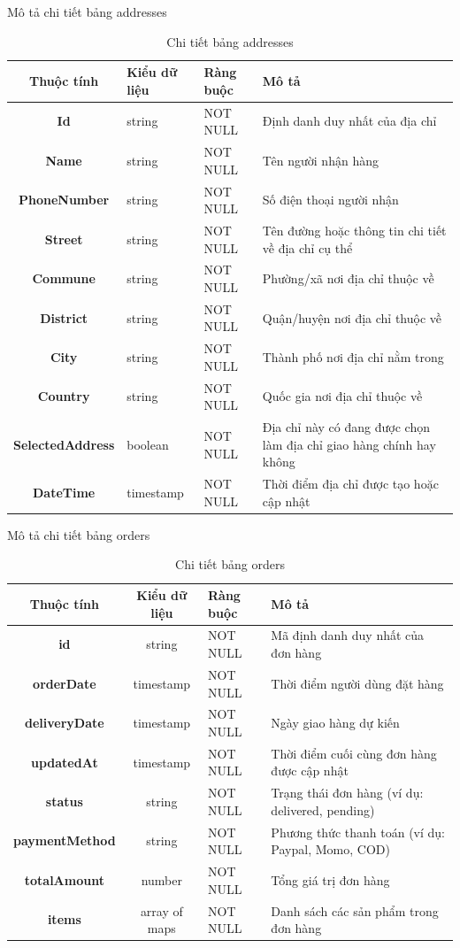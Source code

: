 \documentclass[../DoAn.tex]{subfiles}
\begin{document}
Mô tả chi tiết bảng addresses

\begin{table}[H]
\centering
\begin{tabular}{|c|p{3.5cm}|l|p{7cm}|}
\hline
\textbf{Thuộc tính} & \textbf{Kiểu dữ liệu} & \textbf{Ràng buộc} & \textbf{Mô tả} \\ \hline
\textbf{Id} & string & NOT NULL & Định danh duy nhất của địa chỉ \\ \hline
\textbf{Name} & string & NOT NULL & Tên người nhận hàng \\ \hline
\textbf{PhoneNumber} & string & NOT NULL & Số điện thoại người nhận\\ \hline
\textbf{Street} & string & NOT NULL & Tên đường hoặc thông tin chi tiết về địa chỉ cụ thể \\ \hline
\textbf{Commune} & string & NOT NULL & Phường/xã nơi địa chỉ thuộc về \\ \hline
\textbf{District} & string & NOT NULL & Quận/huyện nơi địa chỉ thuộc về \\ \hline
\textbf{City} & string & NOT NULL & Thành phố nơi địa chỉ nằm trong \\ \hline
\textbf{Country} & string & NOT NULL & Quốc gia nơi địa chỉ thuộc về \\ \hline
\textbf{SelectedAddress} & boolean & NOT NULL & Địa chỉ này có đang được chọn làm địa chỉ giao hàng chính hay không \\ \hline
\textbf{DateTime} & timestamp & NOT NULL & Thời điểm địa chỉ được tạo hoặc cập nhật \\ \hline
\end{tabular}
\caption{Chi tiết bảng addresses}
\label{tab:addressesTable}
\end{table}

Mô tả chi tiết bảng orders
\begin{table}[H]
\centering
\begin{tabular}{|c|c|l|p{7cm}|}
\hline
\textbf{Thuộc tính} & \textbf{Kiểu dữ liệu} & \textbf{Ràng buộc} & \textbf{Mô tả} \\ \hline
\textbf{id} & string & NOT NULL & Mã định danh duy nhất của đơn hàng \\ \hline
\textbf{orderDate} & timestamp & NOT NULL & Thời điểm người dùng đặt hàng \\ \hline
\textbf{deliveryDate} & timestamp & NOT NULL & Ngày giao hàng dự kiến \\ \hline
\textbf{updatedAt} & timestamp & NOT NULL & Thời điểm cuối cùng đơn hàng được cập nhật \\ \hline
\textbf{status} & string & NOT NULL & Trạng thái đơn hàng (ví dụ: delivered, pending) \\ \hline
\textbf{paymentMethod} & string & NOT NULL & Phương thức thanh toán (ví dụ: Paypal, Momo, COD) \\ \hline
\textbf{totalAmount} & number & NOT NULL & Tổng giá trị đơn hàng \\ \hline
\textbf{items} & array of maps & NOT NULL & Danh sách các sản phẩm trong đơn hàng \\ \hline
\end{tabular}
\caption{Chi tiết bảng orders}
\label{tab:ordersTable}
\end{table}
\end{document}
